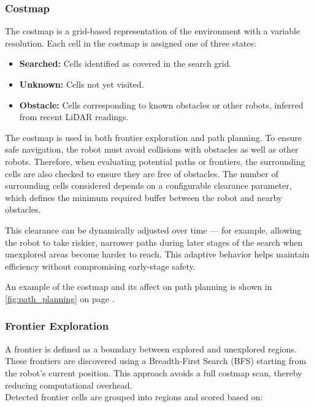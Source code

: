 \subsubsection{Costmap}
\label{sec:costmap}
The costmap is a grid-based representation of the environment with a variable resolution. Each cell in the costmap is assigned one of three states:

\begin{itemize}
  \item \textbf{Searched:} Cells identified as covered in the search grid.
  \item \textbf{Unknown:} Cells not yet visited.
  \item \textbf{Obstacle:} Cells corresponding to known obstacles or other robots, inferred from recent LiDAR readings.
\end{itemize}

The costmap is used in both frontier exploration and path planning. To ensure safe navigation, the robot must avoid collisions with obstacles as well as other robots. Therefore, when evaluating potential paths or frontiers, the surrounding cells are also checked to ensure they are free of obstacles. The number of surrounding cells considered depends on a configurable clearance parameter, which defines the minimum required buffer between the robot and nearby obstacles.

This clearance can be dynamically adjusted over time --- for example, allowing the robot to take riskier, narrower paths during later stages of the search when unexplored areas become harder to reach. This adaptive behavior helps maintain efficiency without compromising early-stage safety.

An example of the costmap and its affect on path planning is shown in \cref{fig:path_planning} on page \pageref{fig:path_planning}.


\subsubsection{Frontier Exploration}
\label{sec:frontier_exploration}
A frontier is defined as a boundary between explored and unexplored regions. These frontiers are discovered using a Breadth-First Search (BFS) starting from the robot's current position. This approach avoids a full costmap scan, thereby reducing computational overhead. \\

Detected frontier cells are grouped into regions and scored based on:

